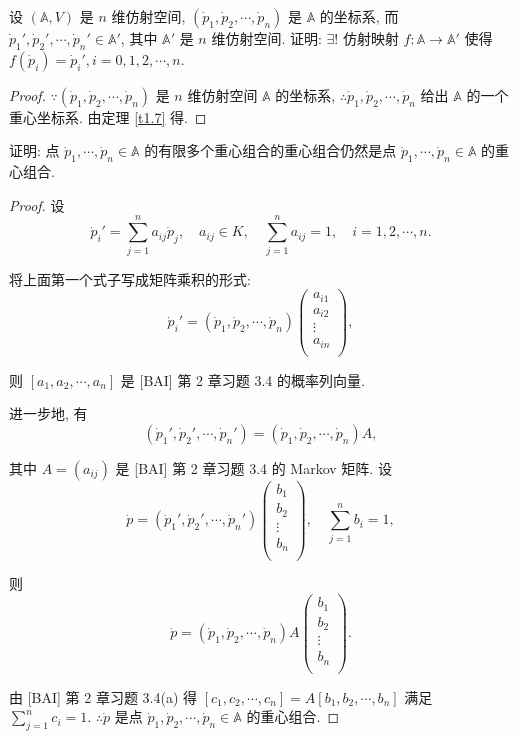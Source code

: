 \documentclass[color=black,device=normal,lang=cn,mode=geye]{elegantnote}
\begin{document}
\begin{exercise}%
    设 $(\mathbb{A},V)$ 是 $n$ 维仿射空间, $(\dot{p}_1,\dot{p}_2,\cdots,\dot{p}_n)$ 是 $\mathbb{A}$ 的坐标系, 而 $\dot{p}_1',\dot{p}_2',\cdots,\dot{p}_n'\in\mathbb{A}'$, 其中 $\mathbb{A}'$ 是 $n$ 维仿射空间. 证明: $\exists!$ 仿射映射 $f:\mathbb{A}\to\mathbb{A}'$ 使得 $f(\dot{p}_i)=\dot{p}_i',i=0,1,2,\cdots,n$.
\end{exercise}
\begin{proof}
    $\because(\dot{p}_1,\dot{p}_2,\cdots,\dot{p}_n)$ 是 $n$ 维仿射空间 $\mathbb{A}$ 的坐标系, $\therefore\dot{p}_1,\dot{p}_2,\cdots,\dot{p}_n$ 给出 $\mathbb{A}$ 的一个重心坐标系. 由定理 \ref{t1.7} 得.
\end{proof}
\begin{exercise}%
    证明: 点 $\dot{p}_1,\cdots,\dot{p}_n\in\mathbb{A}$ 的有限多个重心组合的重心组合仍然是点 $\dot{p}_1,\cdots,\dot{p}_n\in\mathbb{A}$ 的重心组合.
\end{exercise}
\begin{proof}
    设
    \[\dot{p}_i'=\sum\limits_{j=1}^na_{ij}\dot{p}_j,\quad a_{ij}\in K,\quad\sum\limits_{j=1}^na_{ij}=1,\quad i=1,2,\cdots,n.\]

    将上面第一个式子写成矩阵乘积的形式:
    \[\dot{p}_i'=(\dot{p}_1,\dot{p}_2,\cdots,\dot{p}_n)\begin{pmatrix}
        a_{i1} \\
        a_{i2} \\
        \vdots \\
        a_{in} \\
    \end{pmatrix},\]

    则 $[a_1,a_2,\cdots,a_n]$ 是 [BAI] 第 2 章习题 3.4 的概率列向量.

    进一步地, 有
    \[(\dot{p}_1',\dot{p}_2',\cdots,\dot{p}_n')=(\dot{p}_1,\dot{p}_2,\cdots,\dot{p}_n)A,\]

    其中 $A=(a_{ij})$ 是 [BAI] 第 2 章习题 3.4 的 Markov 矩阵. 设
    \[\dot{p}=(\dot{p}_1',\dot{p}_2',\cdots,\dot{p}_n')\begin{pmatrix}
        b_1 \\
        b_2 \\
        \vdots \\
        b_n \\
    \end{pmatrix},\quad\sum\limits_{j=1}^nb_i=1,\]

    则
    \[\dot{p}=(\dot{p}_1,\dot{p}_2,\cdots,\dot{p}_n)A\begin{pmatrix}
        b_1 \\
        b_2 \\
        \vdots \\
        b_n \\
    \end{pmatrix}.\]

    由 [BAI] 第 2 章习题 3.4(a) 得 $[c_1,c_2,\cdots,c_n]=A[b_1,b_2,\cdots,b_n]$ 满足 $\sum\limits_{j=1}^nc_i=1$. $\therefore\dot{p}$ 是点 $\dot{p}_1,\dot{p}_2,\cdots,\dot{p}_n\in\mathbb{A}$ 的重心组合.
\end{proof}
\end{document}
